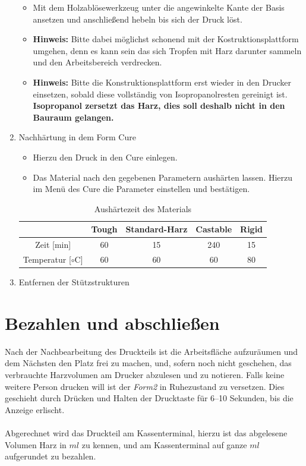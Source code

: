\documentclass{\basedir/fablab-document}
\begin{document}
\begin{enumerate}
\begin{itemize}
            \item Mit dem Holzablösewerkzeug unter die angewinkelte Kante der Basis ansetzen und anschließend hebeln bis sich der Druck löst.
            \item \textbf{Hinweis:} Bitte dabei möglichst schonend mit der Kostruktionsplattform umgehen, denn es kann sein das sich Tropfen mit Harz darunter sammeln und den Arbeitsbereich verdrecken.
            \item \textbf{Hinweis:} Bitte die Konstruktionsplattform erst wieder in den Drucker einsetzen, sobald diese vollständig von Isopropanolresten gereinigt ist. \textbf{Isopropanol zersetzt das Harz, dies soll deshalb nicht in den Bauraum gelangen.}
        \end{itemize}
    \item Nachhärtung in dem Form Cure
        \begin{itemize}
            \item Hierzu den Druck in den Cure einlegen.
            \item Das Material nach den gegebenen Parametern aushärten lassen. Hierzu im Menü des Cure die Parameter einstellen und bestätigen.
        \end{itemize}
    
   \begin{table} [H]
   	\centering
   	\begin{tabular}{|c||c|c|c|c|}\hline
   		& Tough & Standard-Harz & Castable & Rigid\\ \hline\hline
   		Zeit [min]& 60 & 15 & 240 & 15\\ \hline
   		Temperatur [$\circ$C]& 60 & 60 & 60 & 80 \\ \hline
   	\end{tabular}
   	\caption{Aushärtezeit des Materials}
   	\label{table:AusEigenschaften}
   \end{table}

    \item Entfernen der Stützstrukturen

\end{enumerate}


\section{Bezahlen und abschließen}

Nach der Nachbearbeitung des Druckteils ist die Arbeitsfläche aufzuräumen und dem Nächsten den Platz frei zu machen, und, sofern noch nicht geschehen, das verbrauchte Harzvolumen am Drucker abzulesen und zu notieren. Falls keine weitere Person drucken will ist der \textit{Form2} in Ruhezustand zu versetzen. Dies geschieht durch Drücken und Halten der Drucktaste für 6--10 Sekunden, bis die Anzeige erlischt. \\
\\
Abgerechnet wird das Druckteil am Kassenterminal, hierzu ist das abgelesene Volumen Harz in $ml$ zu kennen, und am Kassenterminal auf ganze $ml$ aufgerundet zu bezahlen.
\pagebreak
\end{document}
